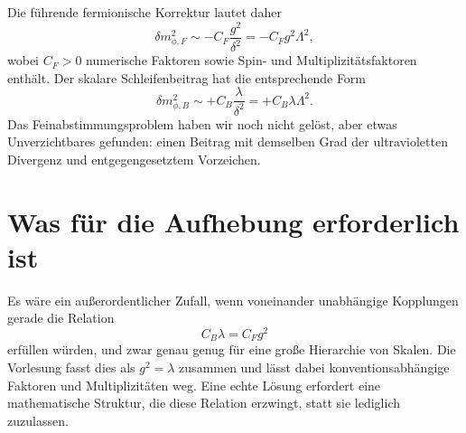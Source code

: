 \begin{classroomqa}
\end{classroomqa}

\begin{classroomqa}
\end{classroomqa}

Die führende fermionische Korrektur lautet daher
\begin{equation}
\delta m_{\phi,F}^2
\sim -C_F\frac{g^2}{\delta^2}
=-C_Fg^2\Lambda^2,
\end{equation}
wobei \(C_F>0\) numerische Faktoren sowie Spin- und Multiplizitätsfaktoren enthält. Der skalare Schleifenbeitrag hat die entsprechende Form
\begin{equation}
\delta m_{\phi,B}^2
\sim+C_B\frac{\lambda}{\delta^2}
=+C_B\lambda\Lambda^2.
\end{equation}
Das Feinabstimmungsproblem haben wir noch nicht gelöst, aber etwas Unverzichtbares gefunden: einen Beitrag mit demselben Grad der ultravioletten Divergenz und entgegengesetztem Vorzeichen.

\section{Was für die Aufhebung erforderlich ist}

Es wäre ein außerordentlicher Zufall, wenn voneinander unabhängige Kopplungen gerade die Relation
\begin{equation}
C_B\lambda=C_Fg^2
\end{equation}
erfüllen würden, und zwar genau genug für eine große Hierarchie von Skalen. Die Vorlesung fasst dies als \(g^2=\lambda\) zusammen und lässt dabei konventionsabhängige Faktoren und Multiplizitäten weg. Eine echte Lösung erfordert eine mathematische Struktur, die diese Relation erzwingt, statt sie lediglich zuzulassen.

